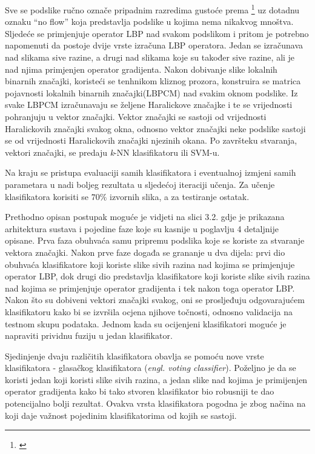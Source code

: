 \documentclass[times, utf8, zavrsni]{fer}
\begin{document}
Sve se podslike ručno označe pripadnim razredima gustoće prema
\footnote{\cite{polus}} uz dotadnu oznaku \enquote{no flow} koja 
predstavlja podslike u kojima nema nikakvog mnoštva. Sljedeće se primjenjuje
operator LBP nad svakom podslikom i pritom je potrebno napomenuti da
 postoje dvije vrste izračuna LBP operatora. Jedan se izračunava nad slikama 
sive razine, a drugi nad slikama koje su također sive razine, ali je nad njima 
primjenjen operator gradijenta. Nakon dobivanje slike lokalnih binarnih 
značajki, koristeći se tenhnikom kliznog prozora, konstruira se matrica 
pojavnosti lokalnih binarnih značajki(LBPCM) nad svakim oknom podslike. 
Iz svake LBPCM izračunavaju se željene Haralickove značajke i te se vrijednosti
pohranjuju u vektor značajki. Vektor značajki se sastoji od vrijednosti
Haralickovih značajki svakog okna, odnosno vektor značajki neke podslike 
sastoji se od vrijednosti Haralickovih značajki njezinih okana. Po završteku 
stvaranja, vektori značajki, se predaju \textit{k}-NN klasifikatoru ili SVM-u.

\newpage

Na kraju se pristupa evaluaciji samih klasifikatora i eventualnoj izmjeni
samih parametara u nadi boljeg rezultata u sljedećoj iteraciji učenja. Za učenje
klasifikatora korisiti se \(70\%\) izvornih slika, a za testiranje ostatak.

\bigbreak

Prethodno opisan postupak moguće je vidjeti na slici 3.2. gdje je
prikazana arhitektura sustava i pojedine faze koje su kasnije u poglavlju 4 
detaljnije opisane. Prva faza obuhvaća samu pripremu podslika koje se 
koriste za stvaranje vektora značajki. Nakon prve faze događa se grananje
u dva dijela: prvi dio obuhvaća klasifikatore koji koriste slike sivih razina 
nad kojima se primjenjuje operator LBP, dok drugi dio predstavlja klasifikatore
koji koriste slike sivih razina nad kojima se primjenjuje operator gradijenta
i tek nakon toga operator LBP. Nakon što su dobiveni vektori značajki 
svakog, oni se prosljeđuju odgovarajućem klasifikatoru kako bi se izvršila
ocjena njihove točnosti, odnosno validacija na testnom skupu podataka.
Jednom kada su ocijenjeni klasifikatori moguće je napraviti prividnu 
fuziju u jedan klasifikator.

\bigbreak

Sjedinjenje dvaju različitih klasifikatora obavlja se pomoću nove vrste
klasifikatora - glasačkog klasifikatora (\textit{engl. voting classifier}).
Poželjno je da se koristi jedan koji koristi slike sivih razina, a jedan 
slike nad kojima je primijenjen operator gradijenta kako bi tako
stvoren klasifikator bio robusniji te dao potencijalno bolji rezultat.
Ovakva vrsta klasifikatora pogodna je zbog načina na koji daje važnost pojedinim
klasifikatorima od kojih se sastoji. 
\end{document}
